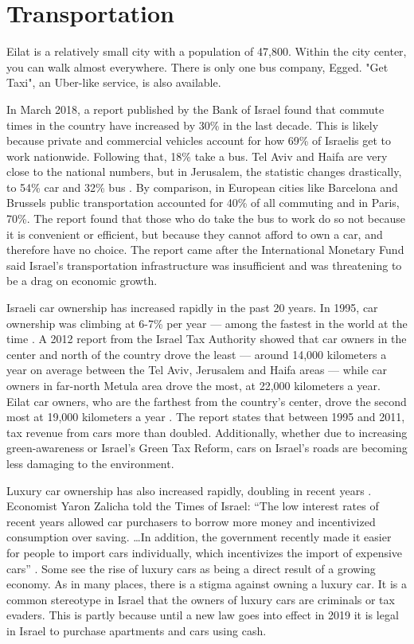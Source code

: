 \documentclass{report}                         %
\begin{document}
\section{Transportation}
Eilat is a relatively small city with a population of 47,800. Within the city center, you can walk almost everywhere. There is only one bus company, Egged. \cite{TransportationEilat} "Get Taxi", an Uber-like service, is also available. 

In March 2018, a report published by the Bank of Israel found that commute times in the country have increased by 30\% in the last decade. This is likely because private and commercial vehicles account for how 69\% of Israelis get to work nationwide. Following that, 18\% take a bus. Tel Aviv and Haifa are very close to the national numbers, but in Jerusalem, the statistic changes drastically, to 54\% car and 32\% bus \cite{Dori2018IsraeliRoads}. By comparison, in European cities like Barcelona and Brussels public transportation accounted for 40\% of all commuting and in Paris, 70\%. The report found that those who do take the bus to work do so not because it is convenient or efficient, but because they cannot afford to own a car, and therefore have no choice. The report came after the International Monetary Fund said Israel’s transportation infrastructure was insufficient and was threatening to be a drag on economic growth. 

Israeli car ownership has increased rapidly in the past 20 years. In 1995, car ownership was climbing at 6-7\% per year --- among the fastest in the world at the time \cite{Slater1995IsraelCulture}. A 2012 report from the Israel Tax Authority showed that car owners in the center and north of the country drove the least --- around 14,000 kilometers a year on average between the Tel Aviv, Jerusalem and Haifa areas --- while car owners in far-north Metula area drove the most, at 22,000 kilometers a year. Eilat car owners, who are the farthest from the country’s center, drove the second most at 19,000 kilometers a year \cite{Schmil2012WhatHow}. The report states that between 1995 and 2011, tax revenue from cars more than doubled. Additionally, whether due to increasing green-awareness or Israel’s Green Tax Reform, cars on Israel's roads are becoming less damaging to the environment\cite{Schmil2012WhatHow}.

Luxury car ownership has also increased rapidly, doubling in recent years \cite{Weinglass2018Rev-upIsrael}. Economist Yaron Zalicha told the Times of Israel: “The low interest rates of recent years allowed car purchasers to borrow more money and incentivized consumption over saving. …In addition, the government recently made it easier for people to import cars individually, which incentivizes the import of expensive cars” \cite{Weinglass2018Rev-upIsrael}. Some see the rise of luxury cars as being a direct result of a growing economy. As in many places, there is a stigma against owning a luxury car. It is a common stereotype in Israel that the owners of luxury cars are criminals or tax evaders. This is partly because until a new law goes into effect in 2019 it is legal in Israel to purchase apartments and cars using cash.
\end{document}
